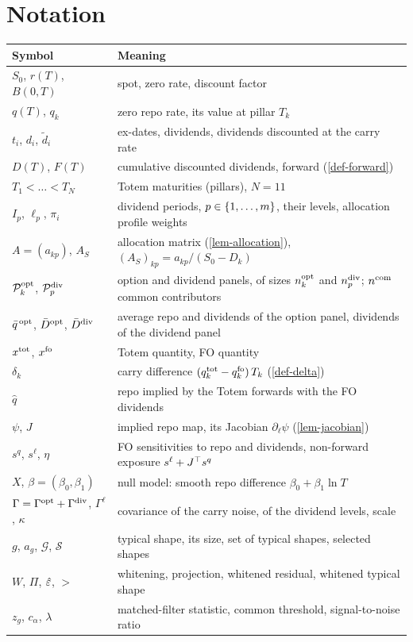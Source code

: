 \section{Notation}\label{app-notation}
\begin{center}\small
\begin{tabular}{@{}>{\raggedright\arraybackslash}p{4.4cm}>{\raggedright\arraybackslash}p{10.6cm}@{}}
\toprule
Symbol & Meaning\\
\midrule
$S_0$, $r(T)$, $B(0, T)$ & spot, zero rate, discount factor\\
$q(T)$, $q_k$ & zero repo rate, its value at pillar $T_k$\\
$t_i$, $d_i$, $\tilde d_i$ & ex-dates, dividends, dividends discounted at the carry rate\\
$D(T)$, $F(T)$ & cumulative discounted dividends, forward (\cref{def-forward})\\
$T_1<\dots<T_N$ & Totem maturities (pillars), $N=11$\\
$I_p$, $\ell_p$, $\pi_i$ & dividend periods, $p\in\{1,\dots,m\}$, their levels, allocation profile weights\\
$A=(a_{kp})$, $A_S$ & allocation matrix (\cref{lem-allocation}), $(A_S)_{kp}=a_{kp}/(S_0-D_k)$\\
$\mathcal{P}^{\mathrm{opt}}_k$, $\mathcal{P}^{\mathrm{div}}_p$ & option and dividend panels, of sizes $n^{\mathrm{opt}}_k$ and $n^{\mathrm{div}}_p$; $n^{\mathrm{com}}$ common
contributors\\
$\bar q^{\,\mathrm{opt}}$, $\bar D^{\mathrm{opt}}$, $\bar D^{\mathrm{div}}$ & average repo and dividends of the option panel, dividends of the dividend panel\\
$x^{\mathrm{tot}}$, $x^{\mathrm{fo}}$ & Totem quantity, FO quantity\\
$\delta_k$ & carry difference $(q^{\mathrm{tot}}_k-q^{\mathrm{fo}}_k)\,T_k$ (\cref{def-delta})\\
$\hat q$ & repo implied by the Totem forwards with the FO dividends\\
$\psi$, $J$ & implied repo map, its Jacobian $\partial_\ell\psi$ (\cref{lem-jacobian})\\
$s^q$, $s^\ell$, $\eta$ & FO sensitivities to repo and dividends, non-forward exposure $s^\ell+{J}^{\top}s^q$\\
$X$, $\beta=(\beta_0, \beta_1)$ & null model: smooth repo difference $\beta_0+\beta_1\ln T$\\
$\Gamma=\Gamma^{\mathrm{opt}}+\Gamma^{\mathrm{div}}$, $\Gamma^\ell$, $\kappa$ & covariance of the carry noise, of the dividend levels,
scale\\
$g$, $a_g$, $\mathcal G$, $\mathcal S$ & typical shape, its size, set of typical shapes, selected shapes\\
$W$, $\Pi$, $\hat\varepsilon$, $\gt$ & whitening, projection, whitened residual, whitened typical shape\\
$z_g$, $c_\alpha$, $\lambda$ & matched-filter statistic, common threshold, signal-to-noise ratio\\
\bottomrule
\end{tabular}
\end{center}

